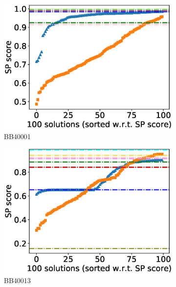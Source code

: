 \begin{figure}[!htbp]
	\centering
	\begin{adjustwidth}{-1cm}{-1cm}
		\begin{subfigure}{0.22\textwidth}
			\includegraphics[width=\columnwidth]{Figure/summary/precomputedInit/Balibase/BB40001_pairs_density_single_run_2}
			\caption{BB40001}
		\end{subfigure}	
		\begin{subfigure}{0.22\textwidth}
			\includegraphics[width=\columnwidth]{Figure/summary/precomputedInit/Balibase/BB40013_pairs_density_single_run_2}
			\caption{BB40013}
		\end{subfigure}
		\begin{subfigure}{0.22\textwidth}

\end{subfigure}
\end{adjustwidth}
\end{figure}
